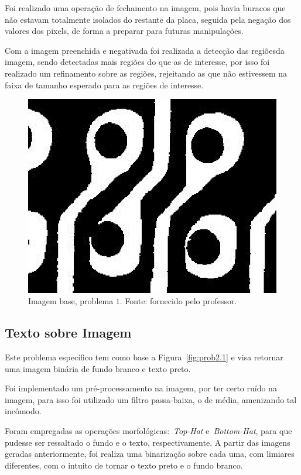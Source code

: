 \documentclass[conference]{Trabalho_2}
\begin{document}
Foi realizado uma opera\c{c}\~ao de fechamento na imagem, pois havia buracos que n\~ao estavam totalmente isolados do restante da placa, seguida pela nega\c{c}\~ao dos valores dos pixels, de forma a preparar para futuras manipula\c{c}\~oes.

Com a imagem preenchida e negativada foi realizada a detec\c{c}\~ao das regi\~oesda imagem, sendo detectadas mais regi\~oes do que as de interesse, por isso foi realizado um refinamento sobre as regi\~oes, rejeitando as que n\~ao estivessem na faixa de tamanho esperado para as regi\~oes de interesse.

  \begin{figure}[]
    \centering
    \includegraphics[width = 4.5 cm]{pcb}
    \caption{Imagem base, problema $1$. Fonte: fornecido pelo professor.}
    \label{fig:prob1.1}
  \end{figure}


\subsection{Texto sobre Imagem}
Este problema espec\'ifico tem como base a Figura~\ref{fig:prob2.1} e visa retornar uma imagem bin\'aria de fundo branco e texto preto.

Foi implementado um pr\'e-processamento na imagem, por ter certo ru\'ido na imagem, para isso foi utilizado um filtro passa-baixa, o de m\'edia, amenizando tal inc\^omodo.

Foram empregadas as opera\c{c}\~oes morfol\'ogicas:~\textit{Top-Hat} e~\textit{Bottom-Hat}, para que pudesse ser ressaltado o fundo e o texto, respectivamente. A partir das imagens geradas anteriormente, foi realiza uma binariza\c{c}\~ao sobre cada uma, com limiares diferentes, com o intuito de tornar o texto preto e o fundo branco.
\end{document}
